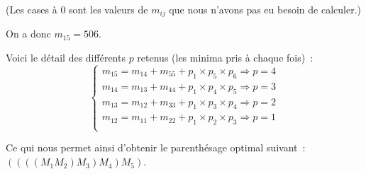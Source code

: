 (Les cases à $0$ sont les valeurs de $m_{ij}$ que nous n'avons pas eu
besoin de calculer.)

On a donc $m_{15} = 506$.

Voici le détail des différents $p$ retenus (les minima pris à chaque
fois)~:
\begin{equation}
\begin{cases}
m_{15} = m_{14} + m_{55} + p_1 \times p_5 \times p_6  \Rightarrow p =
4\\
m_{14} = m_{13} + m_{44} + p_1 \times p_4 \times p_5  \Rightarrow p = 3\\
m_{13} = m_{12} + m_{33} + p_1 \times p_3 \times p_4  \Rightarrow p =
2\\
m_{12} = m_{11} + m_{22} + p_1 \times p_2 \times p_3  \Rightarrow p = 1\\
\end{cases}
\end{equation}

Ce qui nous permet ainsi d'obtenir le parenthésage optimal suivant~: $((((M_1M_2)M_3)M_4)M_5)$.